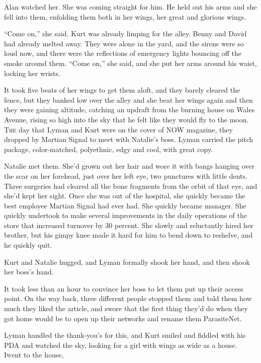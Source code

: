 Alan watched her.  She was coming straight for him.  He held out his
arms and she fell into them, enfolding them both in her wings, her
great and glorious wings.

``Come on,'' she said.  Kurt was already limping for the alley.  Benny
and David had already melted away.  They were alone in the yard, and
the sirens were so loud now, and there were the reflections of
emergency lights bouncing off the smoke around them.  ``Come on,'' she
said, and she put her arms around his waist, locking her wrists.

It took five beats of her wings to get them aloft, and they barely
cleared the fence, but they banked low over the alley and she beat her
wings again and then they were gaining altitude, catching an updraft
from the burning house on Wales Avenue, rising so high into the sky
that he felt like they would fly to the moon.
\\
\lettrine[lines=3, lhang=.5, nindent=0pt, findent=2pt]{T}{he} day that Lyman and Kurt were on the cover of NOW magazine, they
dropped by Martian Signal to meet with Natalie's boss.  Lyman carried
the pitch package, color-matched, polyethnic, edgy and cool, with
great copy.

Natalie met them.  She'd grown out her hair and wore it with bangs
hanging over the scar on her forehead, just over her left eye, two
punctures with little dents.  Three surgeries had cleared all the bone
fragments from the orbit of that eye, and she'd kept her sight.  Once
she was out of the hospital, she quickly became the best employee
Martian Signal had ever had.  She quickly became manager.  She quickly
undertook to make several improvements in the daily operations of the
store that increased turnover by 30 percent.  She slowly and
reluctantly hired her brother, but his gimpy knee made it hard for him
to bend down to reshelve, and he quickly quit.

Kurt and Natalie hugged, and Lyman formally shook her hand, and then
shook her boss's hand.

It took less than an hour to convince her boss to let them put up
their access point.  On the way back, three different people stopped
them and told them how much they liked the article, and swore that the
first thing they'd do when they got home would be to open up their
networks and rename them ParasiteNet.

Lyman handled the thank-you's for this, and Kurt smiled and fiddled
with his PDA and watched the sky, looking for a girl with wings as
wide as a house.
\\
\lettrine[lines=3, lhang=.5, nindent=0pt, findent=2pt]{I} went to the
house,

